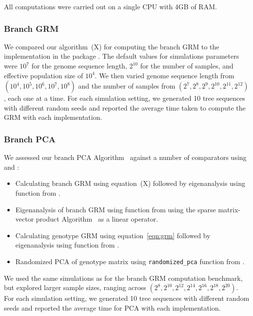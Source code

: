 All computations were carried out on a single CPU with 4GB of RAM.

\subsubsection{Branch GRM}

We compared our algorithm~(X) for computing the branch GRM to
the implementation in the \eGRM{} package \citep{fan2022genealogical}.
%
The default values for simulations parameters were $10^{7}$ for the genome sequence length,
$2^{10}$ for the number of samples, and effective population size of $10^4$.
%
We then varied
genome sequence length from $(10^{4}, 10^{5}, 10^{6}, 10^{7}, 10^{8})$ and
the number of samples from $(2^7, 2^8, 2^9, 2^{10}, 2^{11}, 2^{12})$,
each one at a time.
%
For each simulation setting, we generated 10 tree sequences with different random seeds and
reported the average time taken to compute the GRM with each implementation.

\subsubsection{Branch PCA}

We assessed our branch PCA Algorithm~ against a number of comparators
using \scipy{} \citep{Virtanen2020SciPy} and \scikitallel{} \citep{Miles2024scikit}:
%
\begin{itemize}
    \item Calculating branch GRM using equation~(X) followed by eigenanalysis using \eigh{} function from \scipy{}.
    \item Eigenanalysis of branch GRM using \eigsh{} function from \scipy{} using the sparse matrix-vector product Algorithm~ as a linear operator.
    \item Calculating genotype GRM using equation~\eqref{eqn:grm} followed by eigenanalysis using \eigh{} function from \scipy{}.
    \item Randomized PCA of genotype matrix using \texttt{randomized\_pca} function from \scikitallel{}.
\end{itemize}
%
We used the same simulations as for the branch GRM computation benchmark,
but explored larger sample sizes, ranging across $(2^8, 2^{10}, 2^{12}, 2^{14}, 2^{16}, 2^{18}, 2^{20})$.
%
For each simulation setting, we generated 10 tree sequences with different random seeds and
reported the average time for PCA with each implementation.

